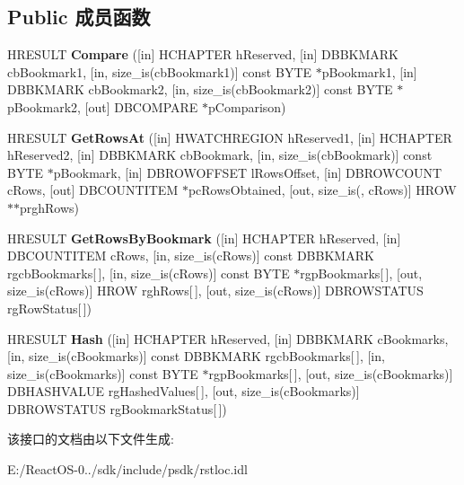 \subsection*{Public 成员函数}
\begin{DoxyCompactItemize}
\item 
\mbox{\label{interface_i_rowset_locate_a15f8123149c541decd3f37e921efbe0b}} 
H\+R\+E\+S\+U\+LT {\bfseries Compare} (\mbox{[}in\mbox{]} H\+C\+H\+A\+P\+T\+ER h\+Reserved, \mbox{[}in\mbox{]} D\+B\+B\+K\+M\+A\+RK cb\+Bookmark1, \mbox{[}in, size\+\_\+is(cb\+Bookmark1)\mbox{]} const B\+Y\+TE $\ast$p\+Bookmark1, \mbox{[}in\mbox{]} D\+B\+B\+K\+M\+A\+RK cb\+Bookmark2, \mbox{[}in, size\+\_\+is(cb\+Bookmark2)\mbox{]} const B\+Y\+TE $\ast$p\+Bookmark2, \mbox{[}out\mbox{]} D\+B\+C\+O\+M\+P\+A\+RE $\ast$p\+Comparison)
\item 
\mbox{\label{interface_i_rowset_locate_a30b52c92db97e9392b98a453c9ceb6df}} 
H\+R\+E\+S\+U\+LT {\bfseries Get\+Rows\+At} (\mbox{[}in\mbox{]} H\+W\+A\+T\+C\+H\+R\+E\+G\+I\+ON h\+Reserved1, \mbox{[}in\mbox{]} H\+C\+H\+A\+P\+T\+ER h\+Reserved2, \mbox{[}in\mbox{]} D\+B\+B\+K\+M\+A\+RK cb\+Bookmark, \mbox{[}in, size\+\_\+is(cb\+Bookmark)\mbox{]} const B\+Y\+TE $\ast$p\+Bookmark, \mbox{[}in\mbox{]} D\+B\+R\+O\+W\+O\+F\+F\+S\+ET l\+Rows\+Offset, \mbox{[}in\mbox{]} D\+B\+R\+O\+W\+C\+O\+U\+NT c\+Rows, \mbox{[}out\mbox{]} D\+B\+C\+O\+U\+N\+T\+I\+T\+EM $\ast$pc\+Rows\+Obtained, \mbox{[}out, size\+\_\+is(, c\+Rows)\mbox{]} H\+R\+OW $\ast$$\ast$prgh\+Rows)
\item 
\mbox{\label{interface_i_rowset_locate_a79d14b6c3fd6e4ee89f5e86fc5f96873}} 
H\+R\+E\+S\+U\+LT {\bfseries Get\+Rows\+By\+Bookmark} (\mbox{[}in\mbox{]} H\+C\+H\+A\+P\+T\+ER h\+Reserved, \mbox{[}in\mbox{]} D\+B\+C\+O\+U\+N\+T\+I\+T\+EM c\+Rows, \mbox{[}in, size\+\_\+is(c\+Rows)\mbox{]} const D\+B\+B\+K\+M\+A\+RK rgcb\+Bookmarks\mbox{[}$\,$\mbox{]}, \mbox{[}in, size\+\_\+is(c\+Rows)\mbox{]} const B\+Y\+TE $\ast$rgp\+Bookmarks\mbox{[}$\,$\mbox{]}, \mbox{[}out, size\+\_\+is(c\+Rows)\mbox{]} H\+R\+OW rgh\+Rows\mbox{[}$\,$\mbox{]}, \mbox{[}out, size\+\_\+is(c\+Rows)\mbox{]} D\+B\+R\+O\+W\+S\+T\+A\+T\+US rg\+Row\+Status\mbox{[}$\,$\mbox{]})
\item 
\mbox{\label{interface_i_rowset_locate_a88184e898c79e3e39b9813f00987d69e}} 
H\+R\+E\+S\+U\+LT {\bfseries Hash} (\mbox{[}in\mbox{]} H\+C\+H\+A\+P\+T\+ER h\+Reserved, \mbox{[}in\mbox{]} D\+B\+B\+K\+M\+A\+RK c\+Bookmarks, \mbox{[}in, size\+\_\+is(c\+Bookmarks)\mbox{]} const D\+B\+B\+K\+M\+A\+RK rgcb\+Bookmarks\mbox{[}$\,$\mbox{]}, \mbox{[}in, size\+\_\+is(c\+Bookmarks)\mbox{]} const B\+Y\+TE $\ast$rgp\+Bookmarks\mbox{[}$\,$\mbox{]}, \mbox{[}out, size\+\_\+is(c\+Bookmarks)\mbox{]} D\+B\+H\+A\+S\+H\+V\+A\+L\+UE rg\+Hashed\+Values\mbox{[}$\,$\mbox{]}, \mbox{[}out, size\+\_\+is(c\+Bookmarks)\mbox{]} D\+B\+R\+O\+W\+S\+T\+A\+T\+US rg\+Bookmark\+Status\mbox{[}$\,$\mbox{]})
\end{DoxyCompactItemize}


该接口的文档由以下文件生成\+:\begin{DoxyCompactItemize}
\item 
E\+:/\+React\+O\+S-\/0../sdk/include/psdk/rstloc.\+idl\end{DoxyCompactItemize}
